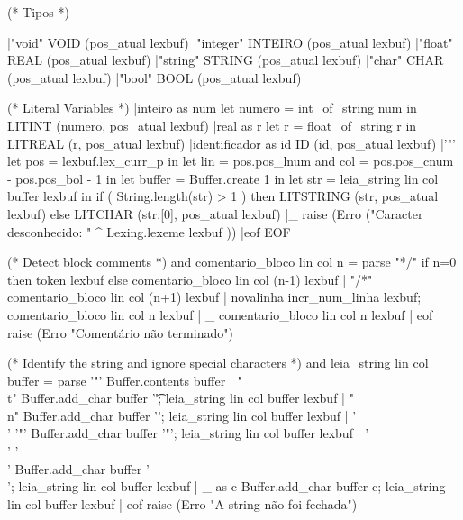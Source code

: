 \documentclass[12pt,a4paper,twoside]{article}
\begin{document}
\begin{terminal}
	(* Tipos *)

	|"void"			{	VOID (pos_atual lexbuf)	    }
	|"integer"	{ INTEIRO (pos_atual lexbuf)  }
  |"float"    { REAL (pos_atual lexbuf)     }
	|"string"		{ STRING (pos_atual lexbuf)   }
	|"char"			{ CHAR (pos_atual lexbuf)     }
	|"bool"			{ BOOL (pos_atual lexbuf)     }
	
	(* Literal Variables *)
	|inteiro as num { let numero = int_of_string num in LITINT (numero, pos_atual lexbuf) }
	|real as r 		{let r = float_of_string r in LITREAL (r, pos_atual lexbuf) }
	|identificador as id { ID (id, pos_atual lexbuf) }
	|'"'			{ let pos = lexbuf.lex_curr_p in
					let lin = pos.pos_lnum
					and col = pos.pos_cnum - pos.pos_bol - 1 in
					let buffer = Buffer.create 1 in
					let str = leia_string lin col buffer lexbuf in if ( String.length(str) > 1 ) then
					LITSTRING (str, pos_atual lexbuf)
          else LITCHAR (str.[0], pos_atual lexbuf) }
	|_ 				{ raise (Erro ("Caracter desconhecido: " ^ Lexing.lexeme lexbuf )) }
	|eof			{ EOF }

(* Detect block comments *)
and comentario_bloco lin col n = parse
	"*/"			{ if n=0 then token lexbuf
					else comentario_bloco lin col (n-1) lexbuf }
	| "/*"			{ comentario_bloco lin col (n+1) lexbuf }
	| novalinha 	{ incr_num_linha lexbuf; comentario_bloco lin col n lexbuf }
	| _				{ comentario_bloco lin col n lexbuf }
	| eof			{ raise (Erro "Comentário não terminado") }

(* Identify the string and ignore special characters *)
and leia_string lin col buffer = parse
	'"'{ Buffer.contents buffer}
		| "\\t"			{ Buffer.add_char buffer '\t'; leia_string lin col buffer lexbuf }
		| "\\n"			{ Buffer.add_char buffer '\n'; leia_string lin col buffer lexbuf }
		| '\\' '"' 	{ Buffer.add_char buffer '"'; leia_string lin col buffer lexbuf }
		| '\\' '\\' { Buffer.add_char buffer '\\'; leia_string lin col buffer lexbuf }
		| _ as c 		{ Buffer.add_char buffer c; leia_string lin col buffer lexbuf}
		| eof				{ raise (Erro "A string não foi fechada")}
\end{terminal}
\end{document}
